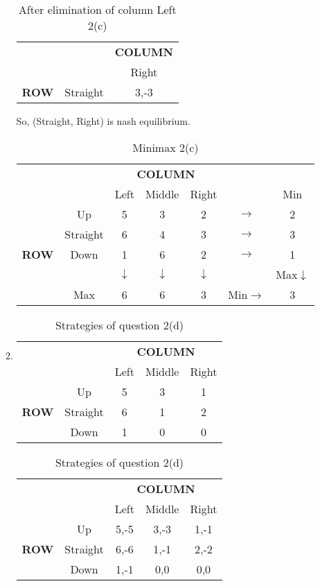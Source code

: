 \documentclass[a4paper,12pt]{article}
\begin{document}
\begin{enumerate}
\begin{enumerate}
\begin{table}[H]
\centering
\begin{tabular}{@{}ccc@{}}
\toprule
& &{\bfseries COLUMN}\\
& & Right\\
{\bfseries ROW} & Straight & 3,-3\\
\bottomrule
\end{tabular}
\caption{After elimination of column Left 2(c)}
\end{table}

So, (Straight, Right) is nash equilibrium.


\begin{table}[H]
\centering
\begin{tabular}{@{}ccccccc@{}}
\toprule
& & \multicolumn{3}{c}{\bfseries COLUMN}\\
& & Left & Middle & Right && Min\\
\multirow{5}{*}{\bfseries ROW} & Up & 5 & 3 & 2 & $\rightarrow$ & 2\\
 & Straight & 6 & 4 & \cellcolor{gray}3 &$\rightarrow$ & 3\\
 & Down & 1 & 6 & 2 & $\rightarrow$ & 1\\
 & & $\downarrow$ & $\downarrow$ & $\downarrow$ && Max$\downarrow$\\
 & Max & 6 & 6 & 3 & Min$\rightarrow$ & 3\\
\bottomrule
\end{tabular}
\caption{Minimax 2(c)}
\end{table}

\item%
\begin{table}[H]
\centering
\begin{tabular}{@{}ccccc@{}}
\toprule
& & \multicolumn{3}{c}{\bfseries COLUMN}\\
& & Left & Middle & Right\\
\multirow{3}{*}{\bfseries ROW} & Up & 5 & 3 & 1\\
 & Straight & 6 & 1 & 2\\
 & Down & 1 & 0 & 0\\
\bottomrule
\end{tabular}
\caption{Strategies of question 2(d)}
\end{table}

\begin{table}[H]
\centering
\begin{tabular}{@{}ccccc@{}}
\toprule
& & \multicolumn{3}{c}{\bfseries COLUMN}\\
& & Left & Middle & Right\\
\multirow{3}{*}{\bfseries ROW} & Up & 5,-5 & 3,-3 & 1,-1\\
 & Straight & 6,-6 & 1,-1 & 2,-2\\
 & Down & 1,-1 & 0,0 & 0,0\\
\bottomrule
\end{tabular}
\caption{Strategies of question 2(d)}
\end{table}
\end{enumerate}


\end{enumerate}
\end{document}
